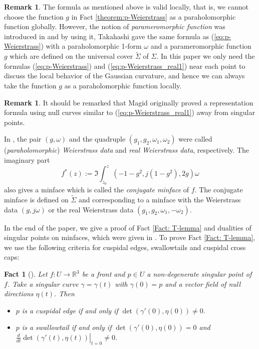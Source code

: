 \documentclass[11pt,reqno]{amsart}
\theoremstyle{plain} %
\newtheorem{fact}[theorem]{Fact}
\theoremstyle{definition}
\newtheorem{remark}[theorem]{Remark}
\begin{document}
\begin{remark}
The formula as mentioned above is valid locally, that is, we cannot choose the function $g$ in Fact \ref{theorem:p-Weierstrass} as a paraholomorphic function globally. However, the notion of {\it parameromorphic function} was introduced in \cite{T} and by using it, Takahashi gave the same formula as (\ref{eq:p-Weierstrass}) with a paraholomorphic 1-form $\omega$ and a parameromorphic function $g$ which are defined on the universal cover $\tilde{\Sigma}$ of $\Sigma$. In this paper we only need the formulas (\ref{eq:p-Weierstrass}) and (\ref{eq:p-Weierstrass_real1}) near each point to discuss the local behavior of the Gaussian curvature, and hence we can always take the function $g$ as a paraholomorphic function locally.
\end{remark}

\begin{remark}
It should be remarked that Magid \cite{Magid} originally proved a representation formula using null curves similar to (\ref{eq:p-Weierstrass_real1}) away from singular points.
\end{remark}

In \cite{T}, the pair $(g,\omega)$ and the quadruple $(g_1, g_2,\omega_1, \omega_2)$ were called ({\it paraholomorphic}) {\it Weierstrass data} and {\it real Weierstrass data}, respectively. The imaginary part
\begin{equation}\label{eq:conjugate}
  f^*(z)
  :=\Im \int^z_{z_0}\left( -1-g^2, j(1-g^2), 2g \right)\omega
\end{equation}
also gives a minface which is called the {\it conjugate minface} of $f$. The conjugate minface is defined on $\tilde{\Sigma}$ and corresponding to a minface with the Weierstrass data $(g,j\omega)$ or the real Weierstrass data $(g_1, g_2,\omega_1, -\omega_2)$.

In the end of the paper, we give a proof of Fact \ref{Fact: T-lemma} and dualities of singular points on minfaces, which were given in \cite{T}. To prove Fact \ref{Fact: T-lemma}, we use the following criteria for cuspidal edges, swallowtails and cuspidal cross caps:
\begin{fact}[\cite{KRSUY}]\label{Fact: KRSUY}
Let $f: U \longrightarrow \mathbb{R}^3$ be a front and $p\in U$ a non-degenerate singular point of $f$. Take a singular curve $\gamma=\gamma(t)$ with $\gamma(0)=p$ and a vector field of null directions $\eta(t)$. Then
\begin{itemize}
\item[(i)] $p$ is a cuspidal edge if and only if $\det\left(\gamma'(0), \eta(0)\right)\neq 0$.
\item[(ii)] $p$ is a swallowtail if and only if $\det\left(\gamma'(0), \eta(0)\right)=0$ and $ \left. \frac{d}{dt}\det\left(\gamma'(t), \eta(t)\right)\right|_{t=0}\neq0$.
\end{itemize}
\end{fact}
\end{document}
